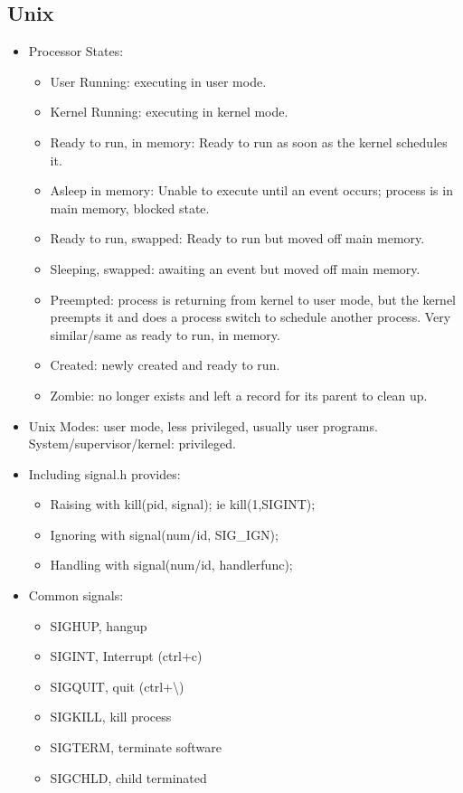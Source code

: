\documentclass[fontsize=5pt]{scrartcl}
\begin{document}
\begin{multicols}{3}
    \section{Unix}
      \begin{itemize}
       \item Processor States:
        \begin{itemize}
         \item User Running: executing in user mode.
         \item Kernel Running: executing in kernel mode.
         \item Ready to run, in memory: Ready to run as soon as the kernel schedules it.
         \item Asleep in memory: Unable to execute until an event occurs; process is in main memory, blocked state.
         \item Ready to run, swapped: Ready to run but moved off main memory.
         \item Sleeping, swapped: awaiting an event but moved off main memory.
         \item Preempted: process is returning from kernel to user mode, but the kernel preempts it and does a process switch
               to schedule another process. Very similar/same as ready to run, in memory.
         \item Created: newly created and ready to run.
         \item Zombie: no longer exists and left a record for its parent to clean up.
        \end{itemize}
        \item Unix Modes: user mode, less privileged, usually user programs. System/supervisor/kernel: privileged.
        \item Including signal.h provides:
        \begin{itemize}
          \item Raising with kill(pid, signal); ie kill(1,SIGINT);
          \item Ignoring with signal(num/id, SIG\_IGN);
          \item Handling with signal(num/id, handlerfunc);
        \end{itemize}
        \item Common signals:
        \begin{itemize}
          \item SIGHUP, hangup
          \item SIGINT, Interrupt (ctrl+c)
          \item SIGQUIT, quit (ctrl+\textbackslash)
          \item SIGKILL, kill process
          \item SIGTERM, terminate software
          \item SIGCHLD, child terminated
        \end{itemize}


\end{itemize}
\end{multicols}
\end{document}
